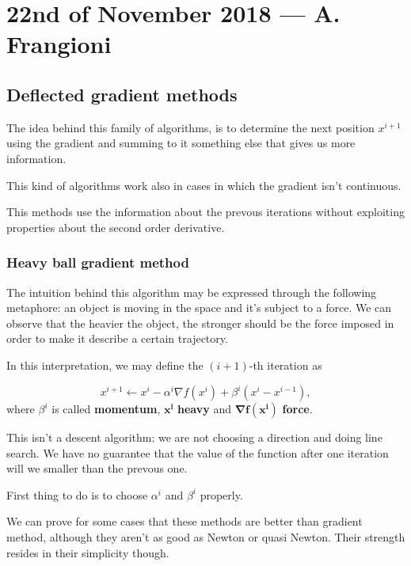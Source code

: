 \documentclass[computationalMathematics.tex]{subfiles}
\begin{document}
\section{22nd of November 2018 --- A. Frangioni}

\subsection{Deflected gradient methods}
The idea behind this family of algorithms, is to determine the next position $x^{i+1}$ using the gradient and summing to it something else that gives us more information.

This kind of algorithms work also in cases in which the gradient isn't continuous.

This methods use the information about the prevous iterations without exploiting properties about the second order derivative.

\subsubsection{Heavy ball gradient method}
The intuition behind this algorithm may be expressed through the following metaphore: an object is moving in the space and it's subject to a force. We can observe that the heavier the object, the stronger should be the force imposed in order to make it describe a certain trajectory.

In this interpretation, we may define the $(i+1)$-th iteration as 

\[
  x^{i+1} \gets x^i - \alpha^i \nabla f(x^i) + \beta^i (x^i - x^{i-1}),
\]
 where {\boldmath${\beta^i}$} is called \textbf{momentum}, $\mathbf{x^i}$ \textbf{heavy} and $\mathbf{\nabla f(x^i)}$ \textbf{force}.

This isn't a descent algorithm: we are not choosing a direction and doing line search. We have no guarantee that the value of the function after one iteration will we smaller than the prevous one.

First thing to do is to choose $\alpha^i$ and $\beta^i$ properly.

We can prove for some cases that these methods are better than gradient method, although they aren't as good as Newton or quasi Newton. Their strength resides in their simplicity though.
\end{document}
